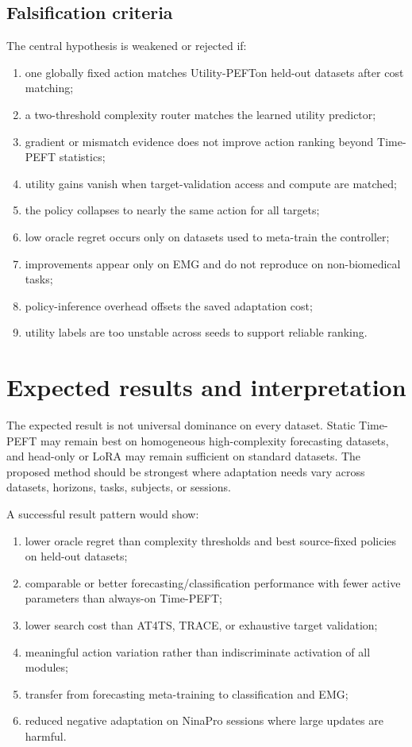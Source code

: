\documentclass[10pt]{article}
\newcommand{\method}{Utility-PEFT}
\begin{document}
\subsection{Falsification criteria}

The central hypothesis is weakened or rejected if:
\begin{enumerate}[leftmargin=*, itemsep=2pt]
    \item one globally fixed action matches \method on held-out datasets after cost matching;
    \item a two-threshold complexity router matches the learned utility predictor;
    \item gradient or mismatch evidence does not improve action ranking beyond Time-PEFT statistics;
    \item utility gains vanish when target-validation access and compute are matched;
    \item the policy collapses to nearly the same action for all targets;
    \item low oracle regret occurs only on datasets used to meta-train the controller;
    \item improvements appear only on EMG and do not reproduce on non-biomedical tasks;
    \item policy-inference overhead offsets the saved adaptation cost;
    \item utility labels are too unstable across seeds to support reliable ranking.
\end{enumerate}

\section{Expected results and interpretation}

The expected result is not universal dominance on every dataset. Static Time-PEFT may remain best on homogeneous high-complexity forecasting datasets, and head-only or LoRA may remain sufficient on standard datasets. The proposed method should be strongest where adaptation needs vary across datasets, horizons, tasks, subjects, or sessions.

A successful result pattern would show:
\begin{enumerate}[leftmargin=*, itemsep=2pt]
    \item lower oracle regret than complexity thresholds and best source-fixed policies on held-out datasets;
    \item comparable or better forecasting/classification performance with fewer active parameters than always-on Time-PEFT;
    \item lower search cost than AT4TS, TRACE, or exhaustive target validation;
    \item meaningful action variation rather than indiscriminate activation of all modules;
    \item transfer from forecasting meta-training to classification and EMG;
    \item reduced negative adaptation on NinaPro sessions where large updates are harmful.
\end{enumerate}
\end{document}
